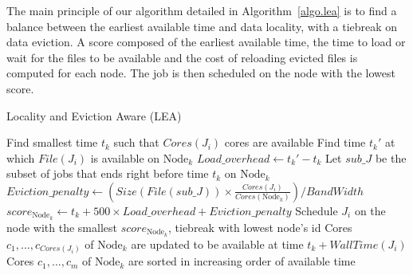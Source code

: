 \documentclass[conference,10pt]{IEEEtran}
\newcommand{\Node}[1]{\ensuremath{\mathrm{Node}_{#1}}\xspace}
\newcommand{\file}{\ensuremath{\mathit{File}}\xspace}
\newcommand{\size}{\ensuremath{\mathit{Size}}\xspace}
\newcommand{\bandwidth}{\mathit{BandWidth}\xspace}
\newcommand{\core}{\mathit{Cores}\xspace}
\newcommand{\walltime}{\mathit{WallTime}\xspace}
\newcommand{\nodeset}{\ensuremath{\mathbb{N}}\xspace}
\begin{document}
The main principle of our algorithm detailed in Algorithm~\ref{algo.lea} 
is to find a balance between the earliest available time and data locality,
with a tiebreak on data eviction. A score  composed of the earliest available 
time, the time to load or wait for the files to be available and the cost of 
reloading evicted files is computed for each node. The job is then scheduled
on the node with the lowest score.


\begin{algorithm*}[htb]%
\caption{Locality and Eviction Aware (LEA)}\label{algo.lea}
\begin{algorithmic}[1]
		\ForEach{$\Node{k} \in \nodeset$}
			\State Find smallest time $t_k$ such that $\core(J_i)$ cores are available
			\State Find time $t_k'$ at which $\file(J_i)$ is available on $\Node{k}$
			\State $Load\_overhead \gets t_k' - t_k$ 
			\State Let $\mathit{sub\_J}$ be the subset of jobs that ends right before time $t_k$ on $\Node{k}$
			\State $Eviction\_penalty \gets (\size(\file(\mathit{sub\_J})) \times \frac{\core(J_i)}{\core(\Node{k})})/\bandwidth$
			\State $score_{\Node{k}} \gets t_k + 500 \times Load\_overhead + Eviction\_penalty$
		\EndFor
		\State Schedule $J_i$ on the node with the smallest $score_{\Node{k}}$, tiebreak with lowest node's id
		\State Cores $c_1, ..., c_{\core(J_i)}$ of $\Node{k}$ are updated to be available at time $t_k + \walltime(J_i)$
		\State Cores $c_1, ..., c_m$ of $\Node{k}$ are sorted in increasing order of available time
	\EndFor
\end{algorithmic}
\end{algorithm*}

\end{document}

